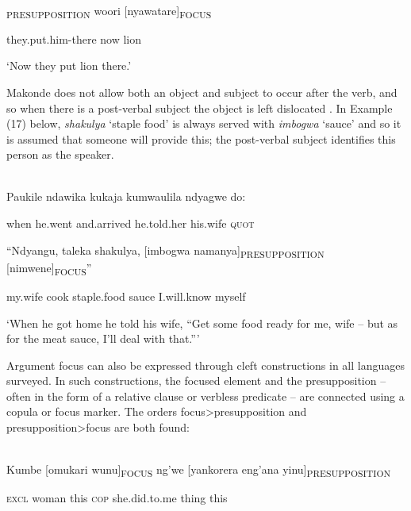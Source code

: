 \documentclass[output=paper]{langsci/langscibook}
\begin{document}
\begin{styleLangSciTranslation}
\ea\label{ex:}
\\
\gll [Mbamuta-ko]\textsubscript{PRESUPPOSITION} woori [nyawatare]\textsubscript{FOCUS}\\
\begin{styleUntitledi}
they.put.him-there now lion
\end{styleUntitledi}

\glt \textup{‘}\textup{Now they put lion there.’}
\z

Makonde does not allow both an object and subject to occur after the verb, and so when there is a post-verbal subject the object is left dislocated \citep[91]{Leach2015}. In Example (17) below, \textit{shakulya} ‘staple food’ is always served with \textit{imbogwa} ‘sauce’ and so it is assumed that someone will provide this; the post-verbal subject identifies this person as the speaker.

\ea\label{ex:}
\\
\gll Paukile ndawika kukaja kumwaulila ndyagwe do:\\
\begin{styleUntitledi}
when he.went and.arrived he.told.her his.wife \textsc{quot}
\end{styleUntitledi}

\gll “Ndyangu, taleka shakulya, [imbogwa namanya]\textsubscript{PRESUPPOSITION} [nimwene]\textsubscript{FOCUS}”\\
\begin{styleUntitledi}
my.wife cook staple.food sauce I.will.know myself
\end{styleUntitledi}

\glt \textup{‘When he got home he told his wife,}\textup{ “Get some food ready for me, wife – but as for the meat sauce, I’ll deal with that.”}\textup{’}
\z

Argument focus can also be expressed through cleft constructions in all languages surveyed. In such constructions, the focused element and the presupposition – often in the form of a relative clause or verbless predicate – are connected using a copula or focus marker. The orders focus{\textgreater}presupposition and presupposition{\textgreater}focus are both found:

\ea\label{ex:}
\\
\gll Kumbe [omukari wunu]\textsubscript{FOCUS} ng’we [yankorera eng’ana yinu]\textsubscript{PRE}\textsubscript{SUPPOSITION}\\
\begin{styleUntitledi}
\textsc{excl} woman this \textsc{cop} she.did.to.me thing this
\end{styleUntitledi}


\end{styleLangSciTranslation}
\end{document}

